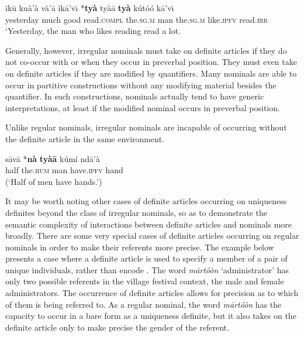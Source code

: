 \documentclass[output=paper,modfonts,nonflat]{langsci/langscibook}
\begin{document}
\ex
\gll
 \=ik\=u ku\`a'\`a v\`a'\=a \`ik\=a'v\=\i{} {\ob}\textnormal{*}{\op}\textbf{ty\`a}{\cp} ty\`a\=a \textbf{ty\`a} k\'ut\'o\'o k\=a'v\=\i{}{\cb}\\
yesterday much good read.\textsc{compl} \phantom{[*(}the.\textsc{sg.m} man the.\textsc{sg.m} like.\textsc{ipfv} read.\textsc{irr}\\
\glt
`Yesterday, the man who likes reading read a lot.
\z 
\z

Generally, however, irregular nominals must take on definite articles if they do not co-occur with  or when they occur in preverbal position.  They must even take on definite articles if they are modified by quantifiers.  Many nominals are able to occur in partitive constructions without any modifying material besides the quantifier.  In such constructions, nominals actually tend to have generic interpretations, at least if the modified nominal occurs in preverbal position.

\z 

\z 

Unlike regular nominals, irregular nominals are incapable of occurring without the definite article in the same environment.

\ea {}\label{ex:cisneros:79}
\gll
{\ob}s\=av\=a \textnormal{*}{\op}\textbf{n\`a}{\cp} \textbf{ty\`a\=a}{\cb} k\'um\'i nd\=a'\`a\\
{\db}half \phantom{*(}the.\textsc{hum} man have.\textsc{ipfv} hand\\
\glt
(`Half of men have hands.')
\z 

It may be worth noting other cases of definite articles occurring on uniqueness definites beyond the class of irregular nominals, so  as to demonstrate the semantic complexity of interactions between definite articles and nominals more broadly.  There are some very special cases of definite articles occurring on regular nominals in order to make their referents more precise.  The example below presents a case where a definite article is used to specify a member of a pair of unique individuals, rather than encode .  The word \textit{m\=art\'o\`on} `administrator' has only two possible referents in the village festival context, the male and female administrators.  The occurrence of definite articles allows for precision as to which of them is being referred to.  As a regular nominal, the word \textit{m\=art\'o\`on} has the capacity to occur in a bare form as a uniqueness definite, but it also takes on the definite article only to make precise the gender of the referent. 
\end{document}
